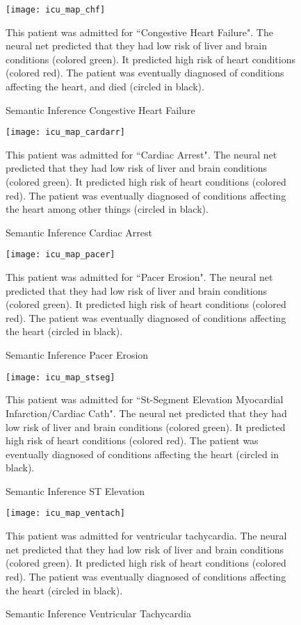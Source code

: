 \begin{figure}
\texttt{[image: icu\_map\_chf]}
\caption{Semantic Inference Congestive Heart Failure}
\vspace{12px}
This patient was admitted for ``Congestive Heart Failure".  The neural net predicted that they had low risk of liver and brain conditions (colored green).  It predicted high risk of heart conditions (colored red).  The patient was eventually diagnosed of conditions affecting the heart, and died (circled in black).
\label{fig:icu_map_chf}
\end{figure}

\begin{figure}
\texttt{[image: icu\_map\_cardarr]}
\caption{Semantic Inference Cardiac Arrest}
\vspace{12px}
This patient was admitted for ``Cardiac Arrest".  The neural net predicted that they had low risk of liver and brain conditions (colored green).  It predicted high risk of heart conditions (colored red).  The patient was eventually diagnosed of conditions affecting the heart among other things (circled in black).
\label{fig:icu_map_cardarr}
\end{figure}

\begin{figure}
\texttt{[image: icu\_map\_pacer]}
\caption{Semantic Inference Pacer Erosion}
\vspace{12px}
This patient was admitted for ``Pacer Erosion".  The neural net predicted that they had low risk of liver and brain conditions (colored green).  It predicted high risk of heart conditions (colored red).  The patient was eventually diagnosed of conditions affecting the heart (circled in black).
\label{fig:icu_map_pacer}
\end{figure}

\begin{figure}
\texttt{[image: icu\_map\_stseg]}
\caption{Semantic Inference ST Elevation}
\vspace{12px}
This patient was admitted for ``St-Segment Elevation Myocardial Infarction/Cardiac Cath".  The neural net predicted that they had low risk of liver and brain conditions (colored green).  It predicted high risk of heart conditions (colored red).  The patient was eventually diagnosed of conditions affecting the heart (circled in black).
\label{fig:icu_map_stseg}
\end{figure}

\begin{figure}
\texttt{[image: icu\_map\_ventach]}
\caption{Semantic Inference Ventricular Tachycardia}
\vspace{12px}
This patient was admitted for ventricular tachycardia.  The neural net predicted that they had low risk of liver and brain conditions (colored green).  It predicted high risk of heart conditions (colored red).  The patient was eventually diagnosed of conditions affecting the heart (circled in black).
\label{fig:icu_map_ventach}
\end{figure}

